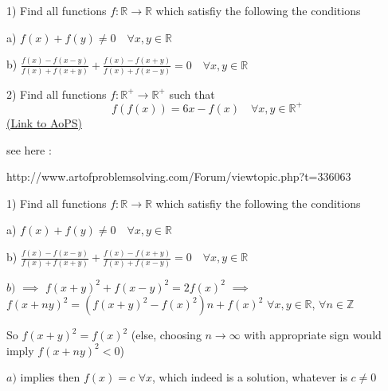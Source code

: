 \begin{problem}
	1) Find all functions $f:\mathbb{R}\to\mathbb{R}$ which satisfiy the following the conditions

a) $f(x)+f(y) \neq 0 \quad \forall x,y \in \mathbb{R}$

b) $\frac{f(x)-f(x-y)}{f(x)+f(x+y)}+\frac{f(x)-f(x+y)}{f(x)+f(x-y)}=0 \quad \forall x,y \in \mathbb{R}$


2) Find all functions $f:\mathbb{R}^+\to\mathbb{R}^+$  such that
\[f(f(x))=6x-f(x) \quad \forall x,y \in \mathbb{R}^+\]
	\flushright \href{https://artofproblemsolving.com/community/c6h563026}{(Link to AoPS)}
\end{problem}



\begin{solution}
	see here : 

http://www.artofproblemsolving.com/Forum/viewtopic.php?t=336063
\end{solution}



\begin{solution}
	\begin{tcolorbox}1) Find all functions $f:\mathbb{R}\to\mathbb{R}$ which satisfiy the following the conditions

a) $f(x)+f(y) \neq 0 \quad \forall x,y \in \mathbb{R}$

b) $\frac{f(x)-f(x-y)}{f(x)+f(x+y)}+\frac{f(x)-f(x+y)}{f(x)+f(x-y)}=0 \quad \forall x,y \in \mathbb{R}$
\end{tcolorbox}
$b)$ $\implies$ $f(x+y)^2+f(x-y)^2=2f(x)^2$ $\implies$ $f(x+ny)^2=(f(x+y)^2-f(x)^2)n+f(x)^2$ $\forall x,y\in\mathbb R$, $\forall n\in\mathbb Z$

So $f(x+y)^2=f(x)^2$ (else, choosing $n\to\infty$ with appropriate sign would imply $f(x+ny)^2<0$)

$a)$ implies then $\boxed{f(x)=c}$ $\forall x$, which indeed is a solution, whatever is $c\ne 0$
\end{solution}



